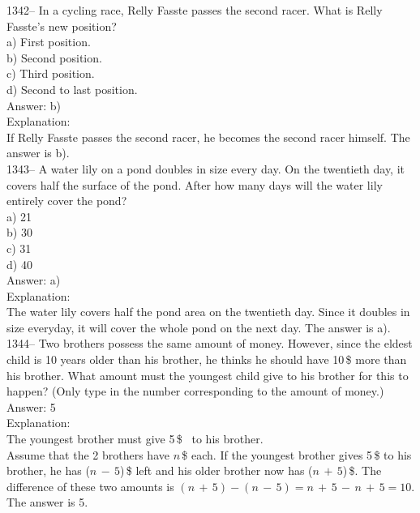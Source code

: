 \documentclass[letterpaper, 12pt]{article}
\begin{document}
1342-- In a cycling race, Relly Fasste passes the second racer. What is Relly Fasste's new position?\\

a) First position.\\
b) Second position.\\
c) Third position.\\
d) Second to last position.\\

Answer: b)\\

Explanation: \\
If Relly Fasste passes the second racer, he becomes the second racer himself. The answer is b).\\

1343-- A water lily on a pond doubles in size every day. On the twentieth day, it covers half the surface of the pond. After how many days will the water lily entirely cover the pond?\\

a) 21\\
b) 30\\
c) 31\\
d) 40\\

Answer: a)\\

Explanation: \\
The water lily covers half the pond area on the twentieth day. Since it doubles in size everyday, it will cover the whole pond on the next day. The answer is a).\\

1344-- Two brothers possess the same amount of money. However, since
the eldest child is 10 years older than his brother, he thinks he
should have 10\,\$ more than his brother. What amount must the
youngest child give to his brother for this to happen?
(Only type in the number corresponding to the amount of money.)\\

Answer: 5\\

Explanation: \\
The youngest brother must give 5\,\$ \ to his brother.  \\
Assume that the 2 brothers have $n$\,\$ each. If the youngest brother gives 5\,\$
to his brother, he has ($n\,-\,5$)\,\$ left and his older brother now has ($n\,+\,5$)\,\$.
The difference of these two amounts is
$(n\,+\,5)-(n\,-\,5)=n\,+\,5\,-\,n\,+\,5=10$.  The answer is 5.\\
\end{document}
